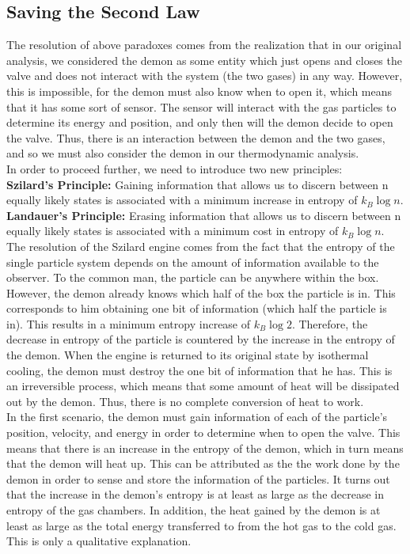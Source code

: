 \documentclass[letterpaper,10pt,english]{article}
\begin{document}
{\subsection{Saving the Second Law}
The resolution of above paradoxes comes from the realization that in our original analysis, we considered the demon as some entity which just opens and closes the valve and does not interact with the system (the two gases) in any way. However, this is impossible, for the demon must also know when to open it, which means that it has some sort of sensor. The sensor will interact with the gas particles to determine its energy and position, and only then will the demon decide to open the valve. Thus, there is an interaction between the demon and the two gases, and so we must also consider the demon in our thermodynamic analysis. \\
In order to proceed further, we need to introduce two new principles: \\
\textbf{Szilard's Principle:} Gaining information that allows us to discern between n equally likely states is associated with a minimum increase in entropy of $k_B \log n$. \\
\textbf{Landauer's Principle:} Erasing information that allows us to discern between n equally likely states is associated with a minimum cost in entropy of $k_B \log n$. \\
The resolution of the Szilard engine comes from the fact that the entropy of the single particle system depends on the amount of information available to the observer. To the common man, the particle can be anywhere within the box. However, the demon already knows which half of the box the particle is in. This corresponds to him obtaining one bit of information (which half the particle is in). This results in a minimum entropy increase of $k_B \log 2$. Therefore, the decrease in entropy of the particle is countered by the increase in the entropy of the demon. When the engine is returned to its original state by isothermal cooling, the demon must destroy the one bit of information that he has. This is an irreversible process, which means that some amount of heat will be dissipated out by the demon. Thus, there is no complete conversion of heat to work. \\


In the first scenario, the demon must gain information of each of the particle's position, velocity, and energy in order to determine when to open the valve. This means that there is an increase in the entropy of the demon, which in turn means that the demon will heat up. This can be attributed as the the work done by the demon in order to sense and store the information of the particles. It turns out that the increase in the demon's entropy is at least as large as the decrease in entropy of the gas chambers. In addition, the heat gained by the demon is at least as large as the total energy transferred to from the hot gas to the cold gas. This is only a qualitative explanation.
}
\end{document}
